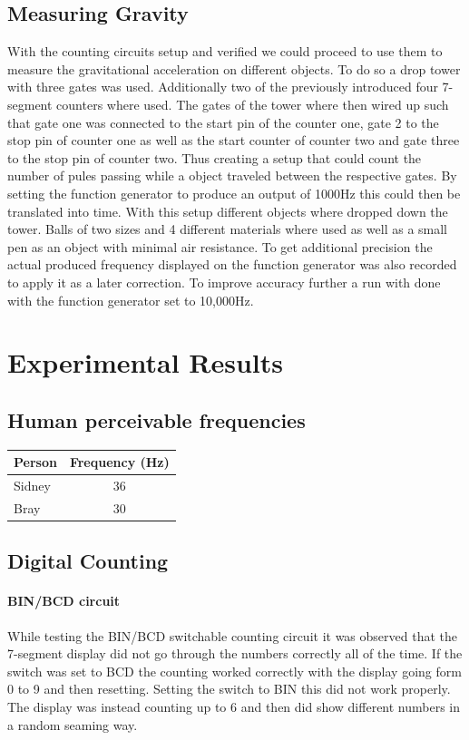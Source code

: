 \documentclass[fleqn,14pt]{article}
\begin{document}
\subsection{Measuring Gravity}
With the counting circuits setup and verified we could proceed to use them to measure the gravitational
acceleration on different objects. To do so a drop tower with three gates was used. Additionally two of the
previously introduced four 7-segment counters where used. The gates of the tower where then wired up such
that gate one was connected to the start pin of the counter one, gate 2 to the stop pin of counter one as
well as the start counter of counter two and gate three to the stop pin of counter two. Thus creating a
setup that could count the number of pules passing while a object traveled between the respective gates.
By setting the function generator to produce an output of 1000Hz this could then be translated into time.
With this setup different objects where dropped down the tower. Balls of two sizes and 4 different materials
where used as well as a small pen as an object with minimal air resistance. To get additional precision
the actual produced frequency displayed on the function generator was also recorded to apply it as a
later correction. To improve accuracy further a run with done with the function generator set to 10,000Hz.

\section{Experimental Results}

\subsection{Human perceivable frequencies}

\vspace{0.5cm}
\begin{tabular}{lc}
  Person & Frequency (Hz)\\
  \midrule
  Sidney & 36\\
  Bray & 30\\
\end{tabular}
\vspace{0.5cm}

\subsection{Digital Counting}
\paragraph{BIN/BCD circuit}
While testing the BIN/BCD switchable counting circuit it was observed that the 7-segment display did not
go through the numbers correctly all of the time. If the switch was set to BCD the counting worked correctly
with the display going form 0 to 9 and then resetting. Setting the switch to BIN this did not work properly.
The display was instead counting up to 6 and then did show different numbers in a random seaming way.
\end{document}
